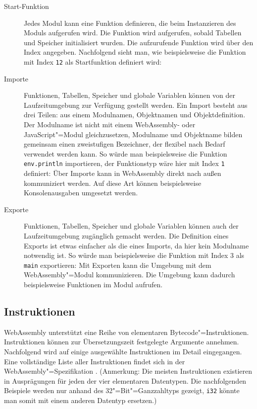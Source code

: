 \begin{description}
    \item[Start-Funktion] Jedes Modul kann eine Funktion definieren, die beim Instanzieren des Moduls aufgerufen wird. Die Funktion wird aufgerufen, sobald Tabellen und Speicher initialisiert wurden. Die aufzurufende Funktion wird über den Index angegeben. Nachfolgend sieht man, wie beispielsweise die Funktion mit Index \lstinline{12} als Startfunktion definiert wird: 
    \item[Importe] Funktionen, Tabellen, Speicher und globale Variablen können von der Laufzeitumgebung zur Verfügung gestellt werden. Ein Import besteht aus drei Teilen: aus einem Modulnamen, Objektnamen und Objektdefinition. Der Modulname ist nicht mit einem WebAssembly- oder JavaScript"=Modul gleichzusetzen, Modulname und Objektname bilden gemeinsam einen zweistufigen Bezeichner, der flexibel nach Bedarf verwendet werden kann. So würde man beispielsweise die Funktion \lstinline{env.println} importieren, der Funktionstyp wäre hier mit Index \lstinline{1} definiert: 
    Über Importe kann in WebAssembly direkt nach außen kommuniziert werden. Auf diese Art können beispielsweise Konsolenausgaben umgesetzt werden.
    \item[Exporte] Funktionen, Tabellen, Speicher und globale Variablen können auch der Laufzeitumgebung zugänglich gemacht werden. Die Definition eines Exports ist etwas einfacher als die eines Imports, da hier kein Modulname notwendig ist. So würde man beispielsweise die Funktion mit Index 3 als \lstinline{main} exportieren: 
    Mit Exporten kann die Umgebung mit dem WebAssembly"=Modul kommunizieren. Die Umgebung kann dadurch beispielsweise Funktionen im Modul aufrufen.
\end{description}

\subsection{Instruktionen}
\label{subsec:WebAssembly-Instruktionen}
WebAssembly unterstützt eine Reihe von elementaren Bytecode"=Instruktionen. Instruktionen können zur Übersetzungszeit festgelegte Argumente annehmen. Nachfolgend wird auf einige ausgewählte Instruktionen im Detail eingegangen. Eine vollständige Liste aller Instruktionen findet sich in der WebAssembly"=Spezifikation \cite{WebAssemblySpecification}. (Anmerkung: Die meisten Instruktionen existieren in Ausprägungen für jeden der vier elementaren Datentypen. Die nachfolgenden Beispiele werden nur anhand des 32"=Bit"=Ganzzahltyps gezeigt, \lstinline{i32} könnte man somit mit einem anderen Datentyp ersetzen.)

